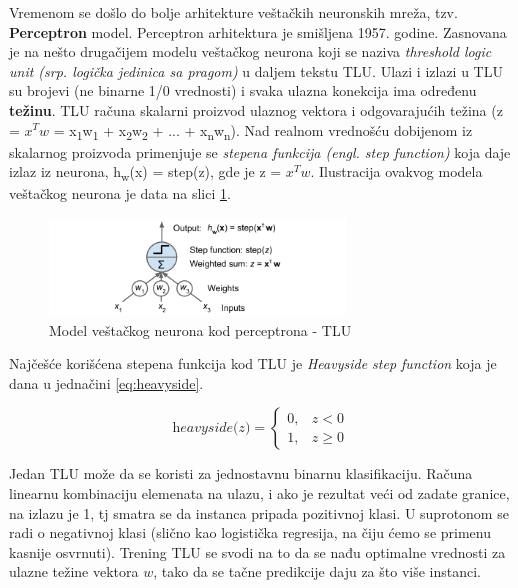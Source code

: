 \documentclass[a4paper,12pt]{report}
\begin{document}
Vremenom se došlo do bolje arhitekture veštačkih neuronskih mreža, tzv. \textbf{Perceptron} model. Perceptron arhitektura je smišljena 1957. godine. Zasnovana je na nešto drugačijem modelu veštačkog neurona koji se naziva \textit{threshold logic unit (srp. logička jedinica sa pragom)} u daljem tekstu TLU. Ulazi i izlazi u TLU su brojevi (ne binarne 1/0 vrednosti) i svaka ulazna konekcija ima određenu \textbf{težinu}. TLU računa skalarni proizvod ulaznog vektora i odgovarajućih težina (z = $x^T w$ = x\textsubscript{1}w\textsubscript{1} + x\textsubscript{2}w\textsubscript{2} + ... + x\textsubscript{n}w\textsubscript{n}).  Nad realnom vrednošću dobijenom iz skalarnog proizvoda primenjuje se \textit{stepena funkcija (engl. step function)} koja daje izlaz iz neurona, h\textsubscript{w}(x) = step(z), gde je z = $x^T w$. Ilustracija ovakvog modela veštačkog neurona je data na slici \ref{fig:perceptronAn}.

\begin{figure}[h]
    \centering
    \includegraphics[width=0.7\textwidth]{perceptron_an_model.png}
    \caption{Model veštačkog neurona kod perceptrona - TLU}\label{fig:perceptronAn}
\end{figure}

Najčešće korišćena stepena funkcija kod TLU je \textit{Heavyside step function} koja je dana u jednačini \eqref{eq:heavyside}. 

\begin{equation}\label{eq:heavyside}
  \textit{heavyside(z)} =
  \begin{cases}
    0, & \textit{z} < 0 \\
    1, & \textit{z} \geq 0
  \end{cases}
\end{equation}

Jedan TLU može da se koristi za jednostavnu binarnu klasifikaciju. Računa linearnu kombinaciju elemenata na ulazu, i ako je rezultat veći od zadate granice, na izlazu je 1, tj smatra se da instanca pripada pozitivnoj klasi. U suprotonom se radi o negativnoj klasi (slično kao logistička regresija, na čiju ćemo se primenu kasnije osvrnuti). Trening TLU se svodi na to da se nađu optimalne vrednosti za ulazne težine vektora $w$, tako da se tačne predikcije daju za što više instanci. \\
\end{document}
